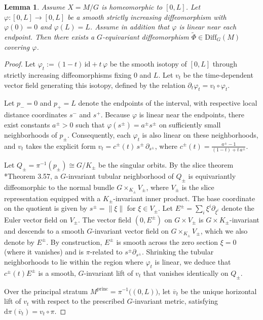 \documentclass[12pt,a4paper]{amsart}
\theoremstyle{plain}
\newtheorem{lemma}[theorem]{Lemma}
\theoremstyle{definition}
\theoremstyle{remark}
\begin{document}
\begin{lemma}\label{lem:intervallift}
Assume $X = M/G$ is homeomorphic to $[0,L]$. Let $\varphi\colon[0,L]\to[0,L]$ be a smooth strictly increasing diffeomorphism
with $\varphi(0)=0$ and $\varphi(L)=L$. Assume in addition that $\varphi$ is linear near each endpoint. Then there exists a
$G$-equivariant diffeomorphism $\widetilde\Phi\in\mathrm{Diff}_G(M)$ covering $\varphi$.
\end{lemma}
\begin{proof}
Let $\varphi_t := (1-t)\,\mathrm{id} + t\,\varphi$ be the smooth isotopy of $[0,L]$ through strictly increasing diffeomorphisms fixing $0$ and $L$. Let $v_t$ be the time-dependent vector field generating this isotopy, defined by the relation $\partial_t\varphi_t = v_t \circ \varphi_t$. 

Let $p_- = 0$ and $p_+ = L$ denote the endpoints of the interval, with respective local distance coordinates $s^-$ and $s^+$. Because $\varphi$ is linear near the endpoints, there exist constants $a^{\pm} > 0$ such that $\varphi(s^{\pm}) = a^{\pm} s^{\pm}$ on sufficiently small neighborhoods of $p_{\pm}$. Consequently, each $\varphi_t$ is also linear on these neighborhoods, and $v_t$ takes the explicit form $v_t = c^{\pm}(t)\,s^{\pm}\,\partial_{s^{\pm}}$, where $c^{\pm}(t) = \frac{a^{\pm}-1}{(1-t) + t\,a^{\pm}}$. 

Let $Q_{\pm} = \pi^{-1}(p_{\pm}) \cong G/K_{\pm}$ be the singular orbits. By the slice theorem \cite{alexandrino2015lie}*{Theorem 3.57}, a $G$-invariant tubular neighborhood of $Q_{\pm}$ is equivariantly diffeomorphic to the normal bundle $G \times_{K_{\pm}} V_{\pm}$, where $V_{\pm}$ is the slice representation equipped with a $K_{\pm}$-invariant inner product. The base coordinate on the quotient is given by $s^{\pm} = \|\xi\|$ for $\xi \in V_{\pm}$. Let $E^{\pm} = \sum_i \xi^i \partial_{\xi^i}$ denote the Euler vector field on $V_{\pm}$. The vector field $(0, E^{\pm})$ on $G \times V_{\pm}$ is $G \times K_{\pm}$-invariant and descends to a smooth $G$-invariant vector field on $G \times_{K_{\pm}} V_{\pm}$, which we also denote by $E^{\pm}$. By construction, $E^{\pm}$ is smooth across the zero section $\xi=0$ (where it vanishes) and is $\pi$-related to $s^{\pm} \partial_{s^{\pm}}$. Shrinking the tubular neighborhoods to lie within the region where $\varphi_t$ is linear, we deduce that $c^{\pm}(t)E^{\pm}$ is a smooth, $G$-invariant lift of $v_t$ that vanishes identically on $Q_{\pm}$.

Over the principal stratum $M^{\mathrm{princ}} = \pi^{-1}\bigl((0,L)\bigr)$, let $\overline{v}_t$ be the unique horizontal lift of $v_t$ with respect to the prescribed $G$-invariant metric, satisfying $\mathrm{d}\pi(\overline{v}_t) = v_t \circ \pi$. 


\end{proof}
\end{document}
